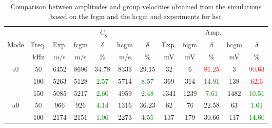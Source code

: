 \begin{table}[!htb]
	\small
	\tabcolsep=0.15cm
	\centering
	\caption{\label{tab:group_velocity_hsc} Comparison between amplitudes and group velocities obtained from the simulations based on the \acf{fcgm} and the \acf{hcgm} and experiments for \acl{hsc}}
	\begin{tabular}{cccccccccccc}
		\toprule
		& & \multicolumn{5}{c}{\(C_g\)} & \multicolumn{5}{c}{Amp.}\\
		Mode & Freq.& Exp. & \ac{fcgm} & \(\delta\) & \ac{hcgm} & \(\delta\) &  Exp. & \ac{fcgm} & \(\delta\) & \ac{hcgm} & \(\delta\)\\
		& \unit{\kHz} & \unit[per-mode = symbol]{\m\per\s} & \unit[per-mode = symbol]{\m\per\s} & \% & \unit[per-mode = symbol]{\m\per\s} & \% & \unit{\mV} & \unit{\mV} & \%& \unit{\mV} & \% \\
		\midrule
		\multirow{3}{*}{\ac{s0}} & 50 & 6452 & 8696 & {34.78} & 8333 & {29.15} & 32 & 6 & \textcolor{red}{81.25} & 3 & \textcolor{red}{90.63}\\
		&100& 5263 & 5128 & \textcolor{green}{2.57} & 5714 & \textcolor{green}{8.57} & 369 & 314 & \textcolor{green}{14.91} & 138 & \textcolor{red}{62.6}\\
		&150& 5085 & 5217 & \textcolor{green}{2.60} & 4959 & \textcolor{green}{2.48} & 1341 & 1239 & \textcolor{green}{7.61} & 1482 & \textcolor{green}{10.51}\\
		\midrule
		\multirow{3}{*}{\ac{a0}} & 50 & 966 & 926 & \textcolor{green}{4.14} & 1316 & {36.23} & 62 & 76 & {22.58} & 63 & \textcolor{green}{1.61}\\
		& 100 & 2174 & 2151 & \textcolor{green}{1.06} & 2273 & \textcolor{green}{4.55} & 137 & 179 & {30.66} & 117 & \textcolor{green}{14.60}\\
		\bottomrule
	\end{tabular}
\end{table}